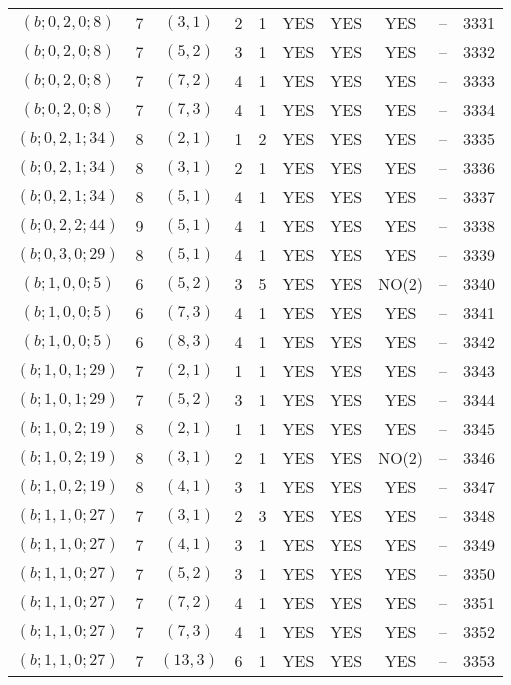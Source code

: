 \begin{longtable}{|c|c|c|c|c|c|c|c|c|c|}
$(b; 0, 2, 0; 8)$ & 7 & $(3, 1)$ & 2 & 1 & YES & YES & YES & -- & 3331\\
$(b; 0, 2, 0; 8)$ & 7 & $(5, 2)$ & 3 & 1 & YES & YES & YES & -- & 3332\\
$(b; 0, 2, 0; 8)$ & 7 & $(7, 2)$ & 4 & 1 & YES & YES & YES & -- & 3333\\
$(b; 0, 2, 0; 8)$ & 7 & $(7, 3)$ & 4 & 1 & YES & YES & YES & -- & 3334\\
$(b; 0, 2, 1; 34)$ & 8 & $(2, 1)$ & 1 & 2 & YES & YES & YES & -- & 3335\\
$(b; 0, 2, 1; 34)$ & 8 & $(3, 1)$ & 2 & 1 & YES & YES & YES & -- & 3336\\
$(b; 0, 2, 1; 34)$ & 8 & $(5, 1)$ & 4 & 1 & YES & YES & YES & -- & 3337\\
$(b; 0, 2, 2; 44)$ & 9 & $(5, 1)$ & 4 & 1 & YES & YES & YES & -- & 3338\\
$(b; 0, 3, 0; 29)$ & 8 & $(5, 1)$ & 4 & 1 & YES & YES & YES & -- & 3339\\
$(b; 1, 0, 0; 5)$ & 6 & $(5, 2)$ & 3 & 5 & YES & YES & NO(2) & -- & 3340\\
$(b; 1, 0, 0; 5)$ & 6 & $(7, 3)$ & 4 & 1 & YES & YES & YES & -- & 3341\\
$(b; 1, 0, 0; 5)$ & 6 & $(8, 3)$ & 4 & 1 & YES & YES & YES & -- & 3342\\
$(b; 1, 0, 1; 29)$ & 7 & $(2, 1)$ & 1 & 1 & YES & YES & YES & -- & 3343\\
$(b; 1, 0, 1; 29)$ & 7 & $(5, 2)$ & 3 & 1 & YES & YES & YES & -- & 3344\\
$(b; 1, 0, 2; 19)$ & 8 & $(2, 1)$ & 1 & 1 & YES & YES & YES & -- & 3345\\
$(b; 1, 0, 2; 19)$ & 8 & $(3, 1)$ & 2 & 1 & YES & YES & NO(2) & -- & 3346\\
$(b; 1, 0, 2; 19)$ & 8 & $(4, 1)$ & 3 & 1 & YES & YES & YES & -- & 3347\\
$(b; 1, 1, 0; 27)$ & 7 & $(3, 1)$ & 2 & 3 & YES & YES & YES & -- & 3348\\
$(b; 1, 1, 0; 27)$ & 7 & $(4, 1)$ & 3 & 1 & YES & YES & YES & -- & 3349\\
$(b; 1, 1, 0; 27)$ & 7 & $(5, 2)$ & 3 & 1 & YES & YES & YES & -- & 3350\\
$(b; 1, 1, 0; 27)$ & 7 & $(7, 2)$ & 4 & 1 & YES & YES & YES & -- & 3351\\
$(b; 1, 1, 0; 27)$ & 7 & $(7, 3)$ & 4 & 1 & YES & YES & YES & -- & 3352\\
$(b; 1, 1, 0; 27)$ & 7 & $(13, 3)$ & 6 & 1 & YES & YES & YES & -- & 3353\\

\end{longtable}
